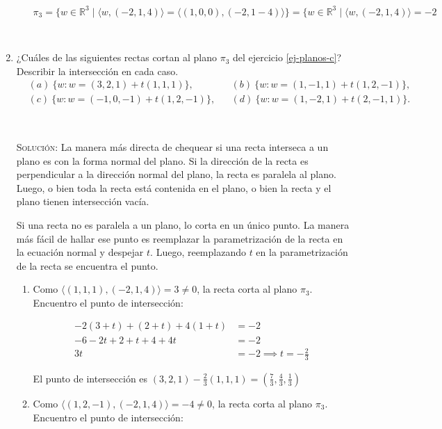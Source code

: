 \documentclass[a4paper,12pt,twoside,spanish,reqno]{amsbook}
\numberwithin{equation}{section}
\newcommand{\rta}{\noindent\textsc{Solución: }}
\begin{document}
\begin{enumerate}[resume]
\begin{enumerate}
$\pi_3 = \{ w \in \mathbb{R}^3 \; | \; \langle w, (-2,1,4) \rangle =  \langle (1,0,0), (-2,1-4) \rangle \} = \boxed{  \{ w \in \mathbb{R}^3 \; | \; \langle w, (-2,1,4) \rangle =  -2 }$
	
\end{enumerate}

\

\item ¿Cu\'ales de las siguientes rectas cortan al plano $\pi_3$ del  ejercicio \eqref{ej-planos-c}?
Describir la intersecci{\'o}n en cada caso.
\begin{align*}
&(a) \ \{w: w=(3,2,1)+t(1,1,1)\}, && (b) \  \{w: w=(1,-1,1)+t(1,2,-1)\}, \\
&(c)\  \{w: w=(-1,0,-1)+t(1,2,-1)\}, && (d) \  \{w: w=(1,-2,1)+t(2,-1,1)\}.
\end{align*}

\

\rta La manera más directa de chequear si una recta interseca a un plano es con la forma normal del plano. Si la dirección de la recta es perpendicular a la dirección normal del plano, la recta es paralela al plano. Luego, o bien toda la recta está contenida en el plano, o bien la recta y el plano tienen intersección vacía.

Si una recta no es paralela a un plano, lo corta en un único punto. La manera más fácil de hallar ese punto es reemplazar la parametrización de la recta en la ecuación normal y despejar $t$. Luego, reemplazando $t$ en la parametrización de la recta se encuentra el punto.

\begin{enumerate}
\item Como $\langle (1,1,1),(-2,1,4) \rangle  = 3 \neq 0 $, la recta corta al plano $\pi_3$. Encuentro el punto de intersección:

\begin{equation*}
\begin{array}{rl}
-2 (3+t) + (2+t) + 4 (1+t) &= -2 \\
-6 - 2t + 2+t + 4 + 4t  &= -2 \\
3t  &= -2 \implies \boxed{t=-\frac{2}{3}}
\end{array}
\end{equation*}

El punto de intersección es $(3,2,1) - \frac{2}{3} (1,1,1) = \boxed{ \left( \frac{7}{3} , \frac{4}{3} , \frac{1}{3} \right) }$

\item Como $\langle (1,2,-1),(-2,1,4) \rangle  = -4 \neq 0 $, la recta corta al plano $\pi_3$. Encuentro el punto de intersección:


\end{enumerate}
\end{enumerate}
\end{document}
